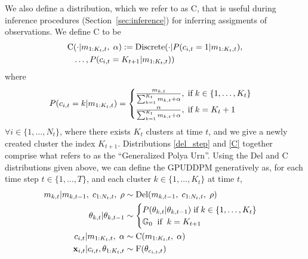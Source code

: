 \documentclass[twocolumn, final]{svjour3}
\begin{document}
We also define a distribution, which we refer to as C, that is useful during inference procedures (Section~\ref{sec:inference}) for inferring assigments of observations. We define C to be
\begin{equation}
\label{C}
\begin{split}
\text{C} &(\cdot | m_{1:K_{t},t}, \hspace{1mm} \alpha) := \text{Discrete}(\cdot | P(c_{i,t}=1 | m_{1:K_{t},t}), \\
&  \ldots, P(c_{i,t}=K_{t+1}  | m_{1:K_{t},t}))
\end{split}
\end{equation}
where
\begin{equation}
\begin{split}
P (c_{i,t}=k  | m_{1:K_{t},t})
= \begin{cases}
\frac{m_{k,t}}{\sum_{k=1}^{K_{t}} m_{k,t} + \alpha}, \hspace{1mm} \text{if} \hspace{1mm} k \in \{ 1, \ldots, K_{t} \} \\
\frac{\alpha}{\sum_{k=1}^{K_{t}} m_{k,t} + \alpha}, \hspace{1mm} \text{if} \hspace{1mm} k = K_{t} + 1
\end{cases}
\end{split}
\end{equation}
$\forall i \in \{1, \ldots, N_{t} \}$, where there exists $K_{t}$ clusters at time $t$, and we give a newly created cluster the index $K_{t+1}$. Distributions \eqref{del_step} and \eqref{C} together comprise what \cite{caron_2007} refers to as the ``Generalized Polya Urn''. Using the Del and C distributions given above, we can define the GPUDDPM generatively as, for each time step $t \in \{1, \ldots, T\}$, and each cluster $k \in \{ 1, \ldots, K_{t} \}$ at time $t$,
\begin{align}
\label{gpuddpm_def}
\begin{split}
m_{k,t} | m_{k,t-1}, \hspace{1mm} c_{1:N_{t}, t}, \hspace{1mm} \rho  &\sim \text{Del}(m_{k,t-1}, \hspace{1mm} c_{1:N_{t}, t}, \hspace{1mm} \rho) \\
\theta_{k, t} | \theta_{k, t-1}   &\sim
\begin{cases}
	P(\theta_{k, t} | \theta_{k, t-1}) \hspace{1mm} \text{if} \hspace{1mm} k \in \{ 1, \ldots, K_{t} \} \\
	\mathbb{G}_{0}   \hspace{2mm} \text{if} \hspace{2mm} k = K_{t+1}
\end{cases} \\
c_{i,t} | m_{1:K_{t},t}, \hspace{1mm} \alpha  &\sim  \text{C} (m_{1:K_{t},t}, \hspace{1mm} \alpha) \\
\bold{x}_{i,t} | c_{i,t}, \theta_{1:K_{t}, t} &\sim \text{F}(\theta_{c_{i,t}, t})
\end{split}
\end{align}
\end{document}
